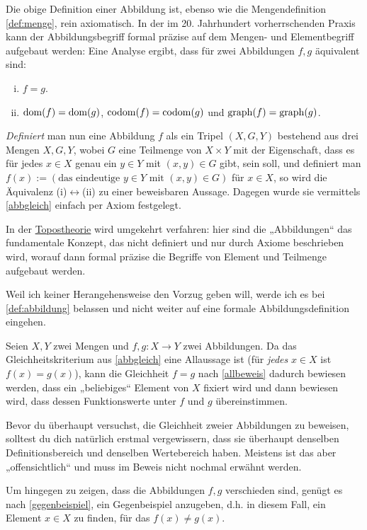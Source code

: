 \begin{vorschau}
    Die obige Definition einer Abbildung ist, ebenso wie die Mengendefinition \cref{def:menge}, rein axiomatisch. In der im 20. Jahrhundert vorherrschenden Praxis kann der Abbildungsbegriff formal präzise auf dem Mengen- und Elementbegriff aufgebaut werden: Eine Analyse ergibt, dass für zwei Abbildungen $f,g$ äquivalent sind:
    \begin{enumerate}[(i)]
        \item $f=g$.
        \item $\operatorname{dom}(f)=\operatorname{dom}(g)$, $\operatorname{codom}(f)=\operatorname{codom}(g)$ und $\operatorname{graph}(f)=\operatorname{graph}(g)$.
    \end{enumerate}
    \emph{Definiert} man nun eine Abbildung $f$ als ein Tripel $(X,G,Y)$ bestehend aus drei Mengen $X,G,Y$, wobei $G$ eine Teilmenge von $X\times Y$ mit der Eigenschaft, dass es für jedes $x\in X$ genau ein $y\in Y$ mit $(x,y)\in G$ gibt, sein soll, und definiert man $f(x):=(\text{das eindeutige $y\in Y$ mit $(x,y)\in G$})$ für $x\in X$, so wird die Äquivalenz (i)$\leftrightarrow$(ii) zu einer beweisbaren Aussage. Dagegen wurde sie vermittels \cref{abbgleich} einfach per Axiom festgelegt.
    
    In der \href{https://en.wikipedia.org/wiki/Topos#Elementary_topoi_(topoi_in_logic)}{Topostheorie} wird umgekehrt verfahren: hier sind die „Abbildungen“ das fundamentale Konzept, das nicht definiert und nur durch Axiome beschrieben wird, worauf dann formal präzise die Begriffe von Element und Teilmenge aufgebaut werden.
    
    Weil ich keiner Herangehensweise den Vorzug geben will, werde ich es bei \cref{def:abbildung} belassen und nicht weiter auf eine formale Abbildungsdefinition eingehen.
\end{vorschau}


\begin{bem}
    Seien $X,Y$ zwei Mengen und $f,g:X\to Y$ zwei Abbildungen. Da das Gleichheitskriterium aus \cref{abbgleich} eine Allaussage ist (für \emph{jedes} $x\in X$ ist $f(x)=g(x)$), kann die Gleichheit $f=g$ nach \cref{allbeweis} dadurch bewiesen werden, dass ein „beliebiges“ Element von $X$ fixiert wird und dann bewiesen wird, dass dessen Funktionswerte unter $f$ und $g$ übereinstimmen.

    Bevor du überhaupt versuchst, die Gleichheit zweier Abbildungen zu beweisen, solltest du dich natürlich erstmal vergewissern, dass sie überhaupt denselben Definitionsbereich und denselben Wertebereich haben. Meistens ist das aber „offensichtlich“ und muss im Beweis nicht nochmal erwähnt werden.

    Um hingegen zu zeigen, dass die Abbildungen $f,g$ verschieden sind, genügt es nach \cref{gegenbeispiel}, ein Gegenbeispiel anzugeben, d.h. in diesem Fall, ein Element $x\in X$ zu finden, für das $f(x)\neq g(x)$.
\end{bem}


